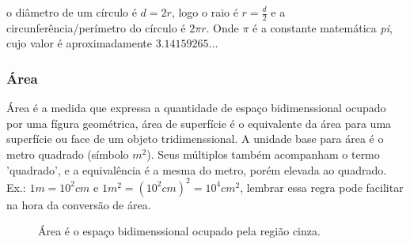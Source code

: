 \begin{multicols*}{2}
    o diâmetro de um círculo é $d = 2r$, logo o raio é $r = \frac{d}{2}$ e a circunferência/perímetro do círculo é $2\pi r$.
    Onde $\pi$ é a constante matemática \textit{pi}, cujo valor é aproximadamente $3.14159265...$


    \subsubsection*{Área}
    Área é a medida que expressa a quantidade de espaço bidimenssional ocupado por uma fígura geométrica,
    área de superfície é o equivalente da área para uma superfície ou face de um objeto tridimenssional. A unidade base
    para área é o metro quadrado (símbolo ${m^2}$). Seus múltiplos também acompanham o termo 'quadrado',
    e a equivalência é a mesma do metro, porém elevada ao quadrado. Ex.: $1m = 10^2cm$ e $1m^2 = (10^2cm)^2 = 10^4cm^2$,
    lembrar essa regra pode facilitar na hora da conversão de área.

    \begin{figure}[H]
        \centering
        \caption{Área é o espaço bidimenssional ocupado pela região cinza.}
        \label{fig:tri_abc}
    \end{figure}


\end{multicols*}
